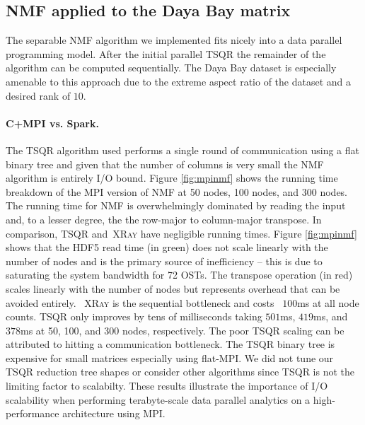 \subsection{NMF applied to the Daya Bay matrix}
The separable NMF algorithm we implemented fits nicely into a data parallel programming model. After the initial parallel TSQR the remainder of the algorithm can be computed sequentially. The Daya Bay dataset is especially amenable to this approach due to the extreme aspect ratio of the dataset and a desired rank of $10$.

\paragraph{C+MPI vs. Spark.}
The TSQR algorithm used performs a single round of communication using a flat binary tree and given that the number of columns is very small the NMF algorithm is entirely I/O bound. Figure \ref{fig:mpinmf} shows the running time breakdown of the MPI version of NMF at 50 nodes, 100 nodes, and 300 nodes. The running time for NMF is overwhelmingly dominated by reading the input and, to a lesser degree, the the row-major to column-major transpose. In comparison, TSQR and~\textsc{XRay} have negligible running times. Figure \ref{fig:mpinmf} shows that the HDF5 read time (in green) does not scale linearly with the number of nodes and is the primary source of inefficiency -- this is due to saturating the system bandwidth for 72 OSTs. The transpose operation (in red) scales linearly with the number of nodes but represents overhead that can be avoided entirely. ~\textsc{XRay} is the sequential bottleneck and costs ~$100$ms at all node counts. TSQR only improves by tens of milliseconds taking $501$ms, $419$ms, and $378$ms at 50, 100, and 300 nodes, respectively. The poor TSQR scaling can be attributed to hitting a communication bottleneck. The TSQR  binary tree is expensive for small matrices especially using flat-MPI. We did not tune our TSQR reduction tree shapes or consider other algorithms since TSQR is not the limiting factor to scalabilty. These results illustrate the importance of I/O scalability when performing terabyte-scale data parallel analytics on a high-performance architecture using MPI.

